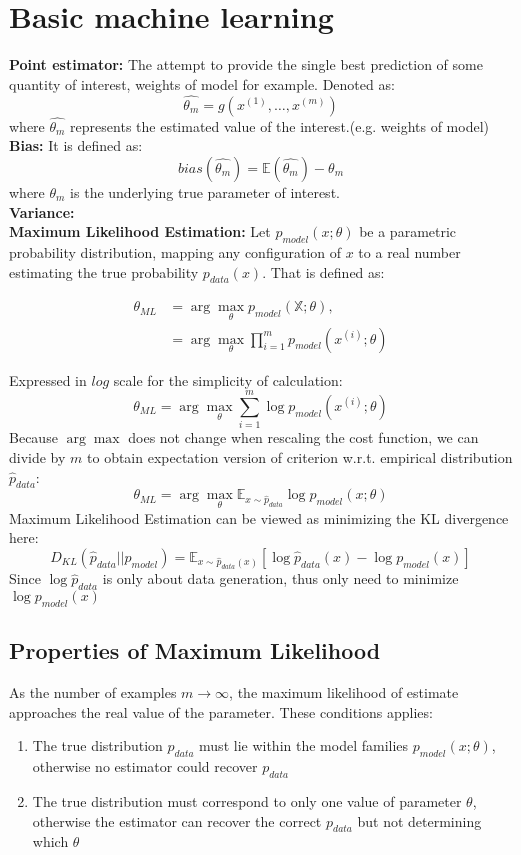 \documentclass{article}
\newcommand{\argmax}{\arg\!\max}
\begin{document}
\section{Basic machine learning}
\textbf{Point estimator: } The attempt to provide the single best prediction of some quantity of interest, weights of model for example. Denoted as:
$$\hat{\theta_{m}} = g(x^{(1)},\dots,x^{(m)})$$
where $\hat{\theta_{m}}$ represents the estimated value of the interest.(e.g. weights of model)\\
\textbf{Bias: } It is defined as:\\
$$bias(\hat{\theta_{m}}) = \mathbb{E}(\hat{\theta_{m}}) - \theta_{m}$$   
where $\theta_{m}$ is the underlying true parameter of interest. \\
\textbf{Variance:}\\
\textbf{Maximum Likelihood Estimation: }
Let $p_{model}(x;\theta)$ be a parametric probability distribution, mapping any configuration of $x$ to a real number estimating the true probability $p_{data}(x)$. That is defined as:

\begin{align*}
\theta_{ML} &= \argmax_\theta p_{model}(\mathbb{X};\theta),\\
&= \argmax_\theta \prod_{i=1}^{m}p_{model}(x^{(i)};\theta)
\end{align*}

Expressed in $log$ scale for the simplicity of calculation:
\[ \theta_{ML} = \argmax_\theta \sum_{i=1}^{m}\log p_{model}(x^{(i)};\theta)\]
Because $\argmax$ does not change when rescaling the cost function, we can divide by $m$ to obtain expectation version of criterion w.r.t. empirical distribution $\hat{p}_{data}$:
\[
    \theta_{ML} = \argmax_\theta \mathbb{E}_{x\sim\hat{p}_{data}} \log p_{model}(x;\theta)    
\]
Maximum Likelihood Estimation can be viewed as minimizing the KL divergence here:
\[
    \textit{D}_{KL}(\hat{p}_{data}||p_{model}) = \mathbb{E}_{x\sim\hat{p}_{data}(x)}[\log\hat{p}_{data}(x) - \log p_{model}(x)]    
\]
Since $\log\hat{p}_{data}$ is only about data generation, thus only need to minimize $\log p_{model}(x)$
\subsection*{Properties of Maximum Likelihood}
As the number of examples $m \rightarrow \infty$, the maximum likelihood of estimate approaches the real value of the parameter. These conditions applies:
\begin{enumerate}
    \item The true distribution $p_{data}$ must lie within the model families $p_{model}(x;\theta)$, otherwise no estimator could recover $p_{data}$
    \item The true distribution must correspond to only one value of parameter $\theta$, otherwise the estimator can recover the correct $p_{data}$ but not determining which $\theta$
\end{enumerate}
\end{document}

